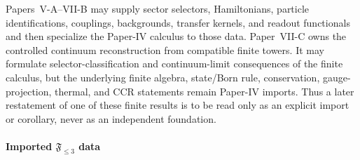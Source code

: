 \documentclass[12pt,a4paper]{article}
\begin{document}
Papers~V-A--VII-B may supply sector selectors, Hamiltonians, particle identifications, couplings, backgrounds, transfer kernels, and readout functionals and then specialize the Paper-IV calculus to those data.  Paper~VII-C owns the controlled continuum reconstruction from compatible finite towers.  It may formulate selector-classification and continuum-limit consequences of the finite calculus, but the underlying finite algebra, state/Born rule, conservation, gauge-projection, thermal, and CCR statements remain Paper-IV imports.  Thus a later restatement of one of these finite results is to be read only as an explicit import or corollary, never as an independent foundation.



\paragraph{Imported \texorpdfstring{$\mathfrak F_{\le3}$}{F<=3} data}
\label{p4:subsec:imported-prefix-data}
\end{document}

